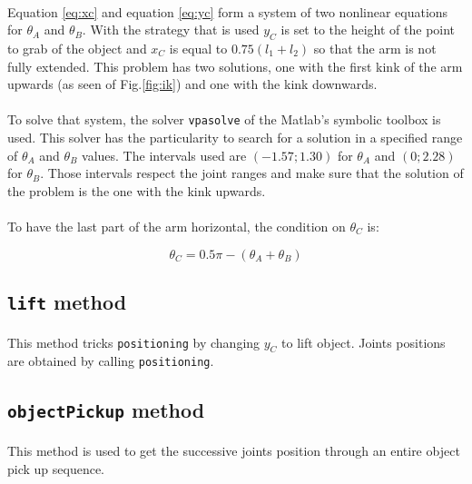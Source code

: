 \documentclass[12pt,a4paper]{article}
\begin{document}
\paragraph{} Equation \ref{eq:xc} and equation \ref{eq:yc} form a system of two nonlinear equations for $\theta_A$ and $\theta_B$. With the strategy that is used $y_C$ is set to the height of the point to grab of the object and $x_C$ is equal to $0.75(l_1+l_2)$ so that the arm is not fully extended. This problem has two solutions, one with the first kink of the arm upwards (as seen of Fig.\ref{fig:ik}) and one with the kink downwards.

\paragraph{} To solve that system, the solver \texttt{vpasolve} of the Matlab's symbolic toolbox is used. This solver has the particularity to search for a solution in a specified range of $\theta_A$ and $\theta_B$ values. The intervals used are $(-1.57; 1.30)$ for $\theta_A$ and $(0; 2.28)$ for $\theta_B$. Those intervals respect the joint ranges and make sure that the solution of the problem is the one with the kink upwards.

\paragraph{} To have the last part of the arm horizontal, the condition on $\theta_C$ is:

\begin{equation}
  \theta_C = 0.5\pi-(\theta_A+\theta_B)
\end{equation}

\subsection{\texttt{lift} method}
\paragraph{} This method tricks \texttt{positioning} by changing $y_C$ to lift object. Joints positions are obtained by calling \texttt{positioning}.

\subsection{\texttt{objectPickup} method}
\paragraph{} This method is used to get the successive joints position through an entire object pick up sequence.
\end{document}

